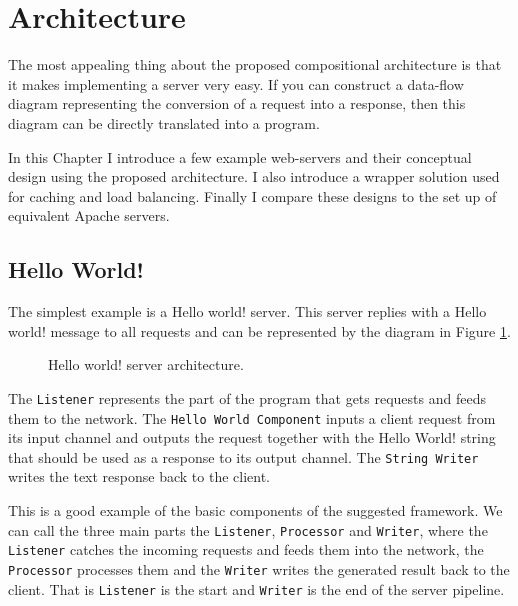 \section{Architecture}
\label{sec:arch}
The most appealing thing about the proposed compositional architecture is that
it makes implementing a server very easy. If you can construct a data-flow diagram 
representing the conversion of a request into a response, then this diagram
can be directly translated into a program.

In this Chapter I introduce a few example web-servers and their conceptual
design using the proposed architecture. I also introduce a wrapper 
solution used for caching and load balancing.
Finally I compare these designs to the set up of equivalent Apache servers.

\subsection{Hello World!}
\label{sec:helloWorld}
The simplest example is a Hello world! server. This server replies with a 
Hello world! message to all requests and can be represented by the diagram
in Figure \ref{fig:helloWorld}.

\begin{figure}[h]
\centering
{}
\caption[scale=1.0]{Hello world! server architecture.}
\label{fig:helloWorld}
\end{figure}

The \texttt{Listener} represents the 
part of the program that gets requests and feeds them to the network.
The \texttt{Hello World Component} inputs a client request from its input channel
and outputs the request together with the Hello World! string that should be 
used as a response to its output channel.
The \texttt{String Writer} writes the text response back to the client.

This is a good example of the basic components of the suggested framework.
We can call the three main parts the \texttt{Listener}, \texttt{Processor} 
and \texttt{Writer}, where
the \texttt{Listener} catches the incoming requests and feeds them into the network,
the \texttt{Processor} processes them and the \texttt{Writer} writes the generated result 
back to the client. That is \texttt{Listener} is the start and \texttt{Writer}
is the end of the server pipeline.


